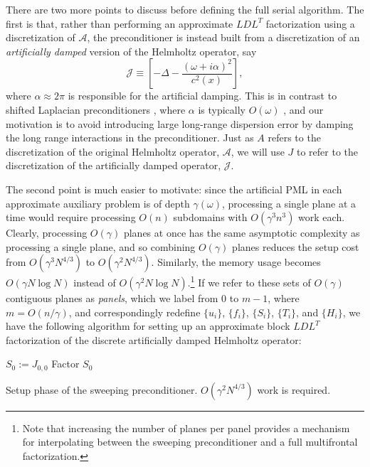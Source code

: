 There are two more points to discuss before defining the full serial algorithm. 
The first is that, rather than performing an approximate $LDL^T$ factorization 
using a discretization of $\mathcal{A}$, the preconditioner is instead built 
from a discretization of an {\em artificially damped} version of the Helmholtz 
operator, say
\begin{equation}\label{artificial-helmholtz}
  \mathcal{J} \equiv 
  \left[-\Delta - \frac{(\omega+i\alpha)^2}{c^2(x)}\right],
\end{equation}
where $\alpha \approx 2 \pi$ is responsible for the artificial damping. This 
is in contrast to shifted Laplacian preconditioners 
\cite{BaylissGoldsteinTurkel-shifted,ErlanggaVuikOosterlee-class}, where 
$\alpha$ is typically $O(\omega)$ \cite{ErnstGander-classical}, and our 
motivation is to avoid introducing large long-range dispersion error by 
damping the long range interactions in the preconditioner. Just as $A$ 
refers to the discretization of the original Helmholtz operator, $\mathcal{A}$,
we will use $J$ to refer to the discretization of the artificially damped 
operator,
$\mathcal{J}$.

The second point is much easier to motivate: since the artificial PML in 
each approximate auxiliary problem is of depth $\gamma(\omega)$, processing 
a single plane at a time would require processing $O(n)$ subdomains with 
$O(\gamma^3 n^3)$ work each. Clearly, processing $O(\gamma)$ planes at once
has the same asymptotic complexity as processing a single plane, and so 
combining $O(\gamma)$ planes reduces the setup cost from $O(\gamma^3 N^{4/3})$ 
to $O(\gamma^2 N^{4/3})$.
Similarly, the memory usage becomes $O(\gamma N \log N)$ instead of 
$O(\gamma^2 N \log N)$.\footnote{Note that increasing the number of planes 
per panel provides a mechanism for interpolating between the sweeping 
preconditioner and a full multifrontal factorization.} If we refer to these 
sets of $O(\gamma)$ contiguous planes as {\em panels}, which we label from 
$0$ to $m-1$, where $m=O(n/\gamma)$, and correspondingly redefine 
$\{u_i\}$, $\{f_i\}$, $\{S_i\}$, $\{T_i\}$, and $\{H_i\}$, 
we have the following algorithm for setting up an approximate 
block $LDL^T$ factorization of the discrete artificially damped Helmholtz 
operator:

\begin{algorithm}
\DontPrintSemicolon
$S_0 := J_{0,0}$\;
Factor $S_0$\;
\caption{Setup phase of the sweeping preconditioner. 
$O(\gamma^2 N^{4/3})$ work is required.}
\label{alg:sweeping-setup}
\end{algorithm}

